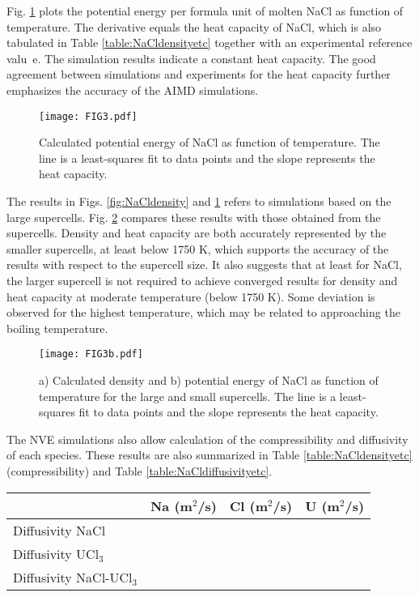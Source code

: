 \documentclass[preprint,3p,10pt,twocolumn,number,sort&compress]{elsarticle}
\begin{document}
Fig. \ref{fig:NaClheatc} plots the potential energy per formula unit of molten NaCl as function of temperature. The derivative equals the heat capacity of NaCl, which is also tabulated in Table \ref{table:NaCldensityetc} together with an experimental reference valu~\cite{}e. The simulation results indicate a constant heat capacity. The good agreement between simulations and experiments for the heat capacity further emphasizes the accuracy of the AIMD simulations.  

\begin{figure}[htb]
\centering
\texttt{[image: FIG3.pdf]}
\caption{Calculated potential energy of NaCl as function of temperature. The line is a least-squares fit to data points and the slope represents the heat capacity.} 
\label{fig:NaClheatc}
\end{figure}

The results in Figs. \ref{fig:NaCldensity} and \ref{fig:NaClheatc} refers to simulations based on the large supercells. Fig. \ref{fig:NaClsize} compares these results with those obtained from the supercells. Density and heat capacity are both accurately represented by the smaller supercells, at least below 1750 K, which supports the accuracy of the results with respect to the supercell size. It also suggests that at least for NaCl, the larger supercell is not required to achieve converged results for density and heat capacity at moderate temperature (below 1750 K). Some deviation is observed for the highest temperature, which may be related to approaching the boiling temperature. 

\begin{figure}[htb]
\centering
\texttt{[image: FIG3b.pdf]}
\caption{a) Calculated density and b) potential energy of NaCl as function of temperature for the large and small supercells. The line is a least-squares fit to data points and the slope represents the heat capacity.} 
\label{fig:NaClsize}
\end{figure}

The NVE simulations also allow calculation of the compressibility and diffusivity of each species. These results are also summarized in Table \ref{table:NaCldensityetc} (compressibility) and Table \ref{table:NaCldiffusivityetc}.

 \begin{table*}[hb!]
\centering
\begin{tabular}{lccc}
\hline
\hline
&Na	(m$^2$/s)&Cl (m$^2$/s)&U (m$^2$/s)\\
\hline
Diffusivity NaCl & & &\\
Diffusivity UCl$_3$	& & &\\
Diffusivity NaCl-UCl$_3$ & & &\\
\hline
\hline
\end{tabular}
\caption{Calculated diffusivities for each species in NaCl, UCl$_3$ and  NaCl-UCl$_3$.}
\label{table:NaCldiffusivityetc}
\end{table*}
\end{document}
